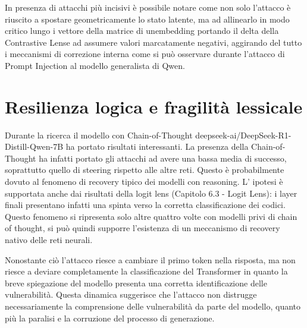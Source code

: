In presenza di attacchi più incisivi è possibile notare come non solo l'attacco è riuscito a spostare geometricamente lo stato latente, ma ad allinearlo in modo critico lungo i vettore della matrice di unembedding portando il delta della Contrastive Lense ad assumere valori marcatamente negativi, aggirando del tutto i meccanismi di correzione interna come si può osservare durante l'attacco di Prompt Injection al modello generalista di Qwen.


\section{Resilienza logica e fragilità lessicale}
Durante la ricerca il modello con Chain-of-Thought deepseek-ai/DeepSeek-R1-Distill-Qwen-7B ha portato risultati interessanti.
La presenza della Chain-of-Thought ha infatti portato gli attacchi ad avere una bassa media di successo, soprattutto quello di steering rispetto alle altre reti.
Questo è probabilmente dovuto al fenomeno di recovery tipico dei modelli con reasoning.
L' ipotesi è supportata anche dai risultati della logit lens (Capitolo 6.3 - Logit Lens): i layer finali presentano infatti una spinta verso la corretta classificazione dei codici.
Questo fenomeno si ripresenta solo altre quattro volte con modelli privi di chain of thought, si può quindi supporre l'esistenza di un meccanismo di recovery nativo delle reti neurali.

Nonostante ciò l'attacco riesce a cambiare il primo token nella risposta, ma non riesce a deviare completamente la classificazione del Transformer in quanto la breve spiegazione del modello presenta una corretta identificazione delle vulnerabilità.
Questa dinamica suggerisce che l'attacco non distrugge necessariamente la comprensione delle vulnerabilità da parte del modello, quanto più la paralisi e la corruzione del processo di generazione.